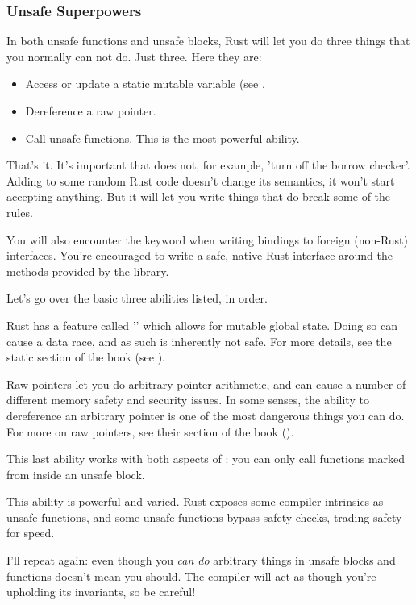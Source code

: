 \subsubsection*{Unsafe Superpowers}

In both unsafe functions and unsafe blocks, Rust will let you do three things that you normally can not do. Just three. Here they are:

\begin{itemize}
  \item{Access or update a static mutable variable (see .}
  \item{Dereference a raw pointer.}
  \item{Call unsafe functions. This is the most powerful ability.}
\end{itemize}

That's it. It's important that  does not, for example, 'turn off the borrow checker'. Adding  to some 
random Rust code doesn't change its semantics, it won't start accepting anything. But it will let you write things that do break 
some of the rules.

\blank

You will also encounter the  keyword when writing bindings to foreign (non-Rust) interfaces. You're encouraged to write 
a safe, native Rust interface around the methods provided by the library.

\blank

Let's go over the basic three abilities listed, in order.


Rust has a feature called '' which allows for mutable global state. Doing so can cause a data race, and as such 
is inherently not safe. For more details, see the static section of the book (see ).


Raw pointers let you do arbitrary pointer arithmetic, and can cause a number of different memory safety and security issues. In 
some senses, the ability to dereference an arbitrary pointer is one of the most dangerous things you can do. For more on raw pointers, 
see their section of the book ().


This last ability works with both aspects of : you can only call functions marked  from inside an unsafe block.

\blank

This ability is powerful and varied. Rust exposes some compiler intrinsics as unsafe functions, and some unsafe functions bypass 
safety checks, trading safety for speed.

\blank

I'll repeat again: even though you \emph{can do} arbitrary things in unsafe blocks and functions doesn't mean you should. The compiler 
will act as though you're upholding its invariants, so be careful!
